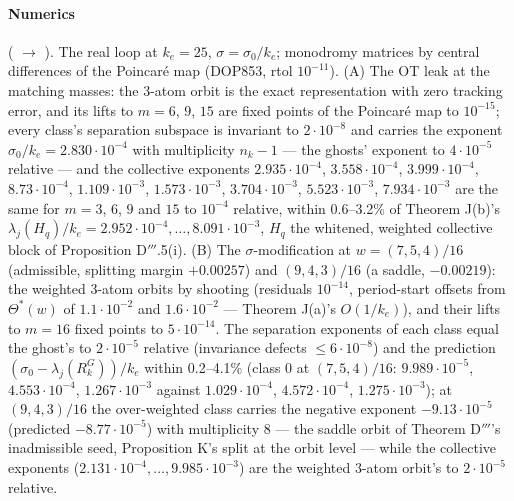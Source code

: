 \paragraph{Numerics} ( $\to$ ). The real loop at
$k_e = 25$, $\sigma = \sigma_0/k_e$; monodromy matrices by central differences of the Poincar\'e map (DOP853, rtol
$10^{-11}$). (A) The OT leak at the matching masses: the 3-atom orbit is the exact representation with zero tracking
error, and its lifts to $m = 6$, $9$, $15$ are fixed points of the Poincar\'e map to $10^{-15}$; every class's
separation subspace is invariant to $2\cdot10^{-8}$ and carries the exponent $\sigma_0/k_e = 2.830\cdot10^{-4}$ with
multiplicity $n_k - 1$ --- the ghosts' exponent to $4\cdot10^{-5}$ relative --- and the collective exponents
$2.935\cdot10^{-4}$, $3.558\cdot10^{-4}$, $3.999\cdot10^{-4}$, $8.73\cdot10^{-4}$, $1.109\cdot10^{-3}$,
$1.573\cdot10^{-3}$, $3.704\cdot10^{-3}$, $5.523\cdot10^{-3}$, $7.934\cdot10^{-3}$ are the same for $m = 3$, $6$, $9$
and $15$ to $10^{-4}$ relative, within 0.6--3.2\% of Theorem J(b)'s
$\lambda_j(H_q)/k_e = 2.952\cdot10^{-4},\dots,8.091\cdot10^{-3}$, $H_q$ the whitened, weighted collective block of
Proposition D$'''$.5(i). (B) The $\sigma$-modification at $w = (7,5,4)/16$ (admissible, splitting margin
$+0.00257$) and $(9,4,3)/16$ (a saddle, $-0.00219$): the weighted 3-atom orbits by shooting (residuals $10^{-14}$,
period-start offsets from $\Theta^*(w)$ of $1.1\cdot10^{-2}$ and $1.6\cdot10^{-2}$ --- Theorem J(a)'s $O(1/k_e)$),
and their lifts to $m = 16$ fixed points to $5\cdot10^{-14}$. The separation exponents of each class equal the
ghost's to $2\cdot10^{-5}$ relative (invariance defects $\le6\cdot10^{-8}$) and the prediction
$(\sigma_0 - \lambda_j(R^G_k))/k_e$ within 0.2--4.1\% (class 0 at $(7,5,4)/16$: $9.989\cdot10^{-5}$,
$4.553\cdot10^{-4}$, $1.267\cdot10^{-3}$ against $1.029\cdot10^{-4}$, $4.572\cdot10^{-4}$, $1.275\cdot10^{-3}$); at
$(9,4,3)/16$ the over-weighted class carries the negative exponent $-9.13\cdot10^{-5}$ (predicted
$-8.77\cdot10^{-5}$) with multiplicity 8 --- the saddle orbit of Theorem D$'''$'s inadmissible seed, Proposition K's
split at the orbit level --- while the collective exponents ($2.131\cdot10^{-4},\dots,9.985\cdot10^{-3}$) are the
weighted 3-atom orbit's to $2\cdot10^{-5}$ relative.

